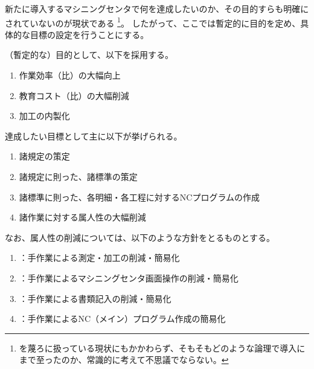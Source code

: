 

新たに導入するマシニングセンタで何を達成したいのか、その目的すらも明確にされていないのが現状である
\footnote{\MMC を蔑ろに扱っている現状にもかかわらず、そもそもどのような論理で導入にまで至ったのか、常識的に考えて不思議でならない。}。
したがって、ここでは暫定的に目的を定め、具体的な目標の設定を行うことにする。



（暫定的な）目的として、以下を採用する。
\begin{enumerate}[label=\sarrow]
\item 作業効率（\MMC 比）の大幅向上
\item 教育コスト（\MMC 比）の大幅削減
\item \Dimple 加工の内製化
\end{enumerate}



達成したい目標として主に以下が挙げられる。
\begin{enumerate}[label=\sarrow]
\item 諸規定の策定
\item 諸規定に則った、諸標準の策定
\item 諸標準に則った、各明細・各工程に対するNCプログラムの作成
\item 諸作業に対する属人性の大幅削減
\end{enumerate}
なお、属人性の削減については、以下のような方針をとるものとする。
\begin{enumerate}[label=\sarrow]
\item {}：手作業による測定・加工の削減・簡易化
\item {}：手作業によるマシニングセンタ画面操作の削減・簡易化
\item {}：手作業による書類記入の削減・簡易化
\item {}：手作業によるNC（メイン）プログラム作成の簡易化
\end{enumerate}




